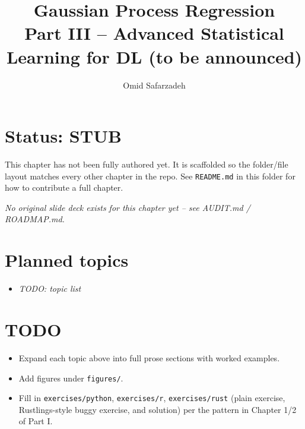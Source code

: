 \documentclass[11pt]{article}
\title{Gaussian Process Regression \\ \large Part III -- Advanced Statistical Learning for DL (to be announced)}
\author{Omid Safarzadeh}
\date{}
\begin{document}
\maketitle

\section*{Status: STUB}
This chapter has not been fully authored yet. It is scaffolded so the
folder/file layout matches every other chapter in the repo. See
\texttt{README.md} in this folder for how to contribute a full chapter.

\textit{No original slide deck exists for this chapter yet -- see AUDIT.md / ROADMAP.md.}



\section*{Planned topics}
\begin{itemize}
  \item \textit{TODO: topic list}
\end{itemize}

\section*{TODO}
\begin{itemize}
  \item Expand each topic above into full prose sections with worked examples.
  \item Add figures under \texttt{figures/}.
  \item Fill in \texttt{exercises/python}, \texttt{exercises/r}, \texttt{exercises/rust}
        (plain exercise, Rustlings-style buggy exercise, and solution) per the
        pattern in Chapter 1/2 of Part I.
\end{itemize}
\end{document}
